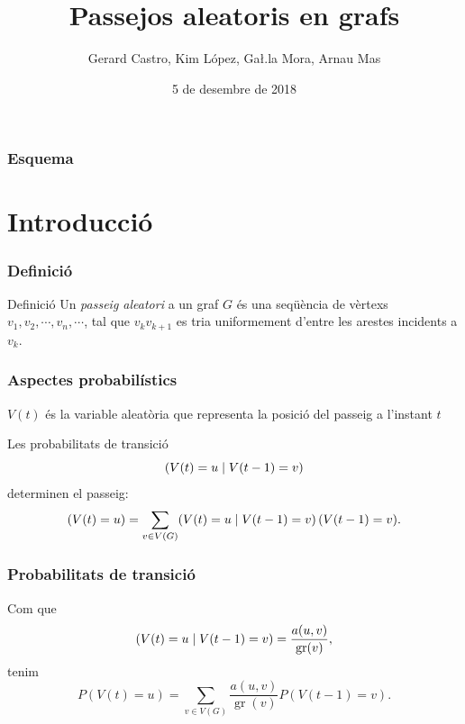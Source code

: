 \documentclass[aspectratio=169, 12pt]{beamer}
\title{Passejos aleatoris en grafs}
\author{Gerard Castro, Kim López, Ga\l.la Mora, Arnau Mas}
\date{5 de desembre de 2018}
\let\P\relax
\DeclareMathOperator{\P}{P}
\DeclareMathOperator{\gr}{gr}
\begin{document}
\begin{frame}
	\titlepage
\end{frame}

\begin{frame}
	\frametitle{Esquema}
	\tableofcontents

\end{frame}

\section{Introducció}

\begin{frame}
	\frametitle{Definició}
	\begin{block}{Definició}
		Un \emph{passeig aleatori} a un graf \( G \) és una seqüència de vèrtexs \( v_1, v_2, \cdots, v_n, \cdots \), tal que \( v_kv_{k+1} \) es tria uniformement d'entre les arestes incidents a \( v_k \).
	\end{block}
\end{frame}

\begin{frame}
	\frametitle{Aspectes probabilístics}
	\( V(t) \) és la variable aleatòria que representa la posició del passeig a l'instant \( t \) \pause

	Les probabilitats de transició \[ \P(V(t) = u \mid V(t - 1) = v) \] determinen el passeig: \pause
	\begin{equation*}
		\P(V(t) = u) = \sum_{v \in V(G)} \P(V(t) = u \mid V(t - 1) = v) \, \P(V(t - 1) = v).
	\end{equation*}
\end{frame}

\begin{frame}
	\frametitle{Probabilitats de transició}
	Com que \[ \P(V(t) = u \mid V(t - 1) = v) = \frac{a(u,v)}{\gr(v)}, \] \pause
	tenim
	\[ P(V(t) = u) = \sum_{v \in V(G)} \frac{a(u,v)}{\gr(v)}P(V(t - 1) = v). \]
\end{frame}
\end{document}
